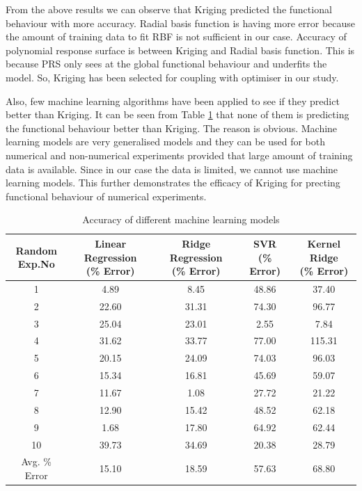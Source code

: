 From the above results we can observe that Kriging predicted the functional behaviour with more accuracy. Radial basis function is having more error because the amount of training data to fit RBF is not sufficient in our case. Accuracy of polynomial response surface is between Kriging and Radial basis function. This is because PRS only sees at the global functional behaviour and underfits the model. So, Kriging has been selected for coupling with optimiser in our study.

Also, few machine learning algorithms have been applied to see if they predict better than Kriging. It can be seen from Table \ref{Accuracy of different machine learning models} that none of them is predicting the functional behaviour better than Kriging. The reason is obvious. Machine learning models are very generalised models and they can be used for both numerical and non-numerical experiments provided that large amount of training data is available. Since in our case the data is limited, we cannot use machine learning models. This further demonstrates the efficacy of Kriging for precting functional behaviour of numerical experiments.
\begin{table}[H]
	\caption{Accuracy of different machine learning models}
	\label{Accuracy of different machine learning models}
	\centering
	\begin{tabular}{ccccc}
		\hline \hline
		\specialcell{ Random \\ Exp.No}	& \specialcell{Linear Regression \\ (\% Error)}	&\specialcell{Ridge Regression \\ (\% Error)}	& \specialcell{SVR \\ (\% Error)} & \specialcell{Kernel Ridge \\ (\% Error)} \\
		\hline \hline
		1 &4.89	&8.45	&48.86	&37.40 \\
		2 &22.60	&31.31	&74.30	&96.77 \\
		3 &25.04	&23.01	&2.55	&7.84 \\
		4 &31.62	&33.77	&77.00	&115.31 \\
		5 &20.15	&24.09	&74.03	&96.03 \\
		6 &15.34	&16.81	&45.69	&59.07 \\
		7 &11.67	&1.08	&27.72	&21.22 \\
		8 &12.90	&15.42	&48.52	&62.18 \\
		9 &1.68	&17.80	&64.92	&62.44  \\ 
		10 &39.73	&34.69	&20.38	&28.79 \\
		\hline \hline
		Avg. \% Error  &15.10	&18.59	&57.63	&68.80		 \\
		\hline \hline
	\end{tabular}
\end{table}


